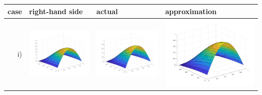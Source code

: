 \documentclass[11pt]{article}
\theoremstyle{definition}
\theoremstyle{remark}
\theoremstyle{plain}
\begin{document}
\begin{center}
  \begin{tabular}{|>{\centering\arraybackslash}r|m{4.3cm}|m{4.3cm}|m{4.3cm}|}
    \hline
    case&right-hand side& actual & approximation\\\hline
    i)&\includegraphics[width=\linewidth]{../Figures/poisson_rhs_1.png}&\includegraphics[width=\linewidth]{../Figures/poisson_actual_1.png}&\includegraphics[width=\linewidth]{../Figures/poisson_approx_1.png}\\\hline

\end{tabular}
\end{center}
\end{document}
